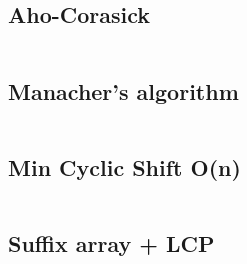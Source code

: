 \documentclass{article}
\begin{document}
\subsection{Aho-Corasick}
\inputminted[mathescape, breaklines, breakafter=(, tabsize=2, frame=lines, showtabs, tab=|\ , tabcolor=lightgray]{c++}{./strings/aho-corasick/aho-corasick.cpp}
\subsection{Manacher's algorithm}
\inputminted[mathescape, breaklines, breakafter=(, tabsize=2, frame=lines, showtabs, tab=|\ , tabcolor=lightgray]{c++}{./strings/manacher/manacher.cpp}
\subsection{Min Cyclic Shift O(n)}
\inputminted[mathescape, breaklines, breakafter=(, tabsize=2, frame=lines, showtabs, tab=|\ , tabcolor=lightgray]{c++}{./strings/min-cyclic_shift/min-cyclic-shift.cpp}
\subsection{Suffix array + LCP}
\inputminted[mathescape, breaklines, breakafter=(, tabsize=2, frame=lines, showtabs, tab=|\ , tabcolor=lightgray]{c++}{./strings/suff-array/suff-array.cpp}


\onecolumn






\end{document}
